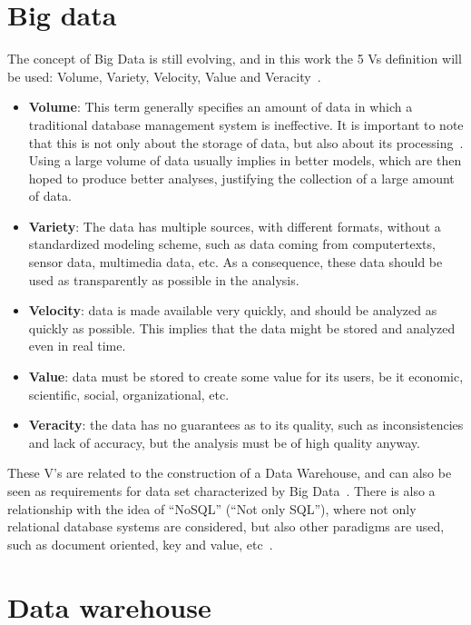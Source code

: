 \section{Big data}\label{ch:fun:bigdata}

The concept of Big Data is still evolving, and in this work the 5 Vs definition will be used: Volume, Variety, Velocity, Value and Veracity~\cite{kacfahemaniUnderstandableBigData2015}.

\begin{itemize}[noitemsep]
  \item \textbf{Volume}: This term generally specifies an amount of data in which a traditional database management system is ineffective.
  It is important to note that this is not only about the storage of data, but also about its processing~\cite{boussoufBigDataBased2018}.
  Using a large volume of data usually implies in better models, which are then hoped to produce better analyses, justifying the collection of a large amount of data.
  \item \textbf{Variety}: The data has multiple sources, with different formats, without a standardized modeling scheme, such as data coming from computertexts, sensor data, multimedia data, etc.
  As a consequence, these data should be used as transparently as possible in the analysis.
  \item \textbf{Velocity}: data is made available very quickly, and should be analyzed as quickly as possible.
  This implies that the data might be stored and analyzed even in real time.
  \item \textbf{Value}: data must be stored to create some value for its users, be it economic, scientific, social, organizational, etc.
  \item \textbf{Veracity}: the data has no guarantees as to its quality, such as inconsistencies and lack of accuracy, but the analysis must be of high quality anyway.
\end{itemize}

These V's are related to the construction of a Data Warehouse, and can also be seen as requirements for data set characterized by Big Data~\cite{zhangBigDataFramework2017}.
There is also a relationship with the idea of ``NoSQL'' (``Not only SQL''), where not only relational database systems are considered, but also other paradigms are used, such as document oriented, key and value, etc~\cite{bimonteOpenIssuesBig2016}.

\section{Data warehouse}\label{ch:fun:dw}


